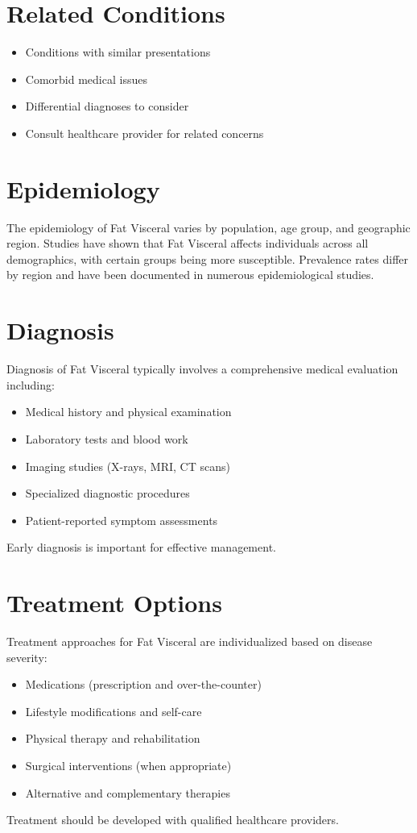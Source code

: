 \section*{Related Conditions}
\begin{itemize}
  \item Conditions with similar presentations
  \item Comorbid medical issues
  \item Differential diagnoses to consider
  \item Consult healthcare provider for related concerns
\end{itemize}

\section*{Epidemiology}
The epidemiology of Fat Visceral varies by population, age group, and geographic region. Studies have shown that Fat Visceral affects individuals across all demographics, with certain groups being more susceptible. Prevalence rates differ by region and have been documented in numerous epidemiological studies.

\section*{Diagnosis}
Diagnosis of Fat Visceral typically involves a comprehensive medical evaluation including:
\begin{itemize}
  \item Medical history and physical examination
  \item Laboratory tests and blood work
  \item Imaging studies (X-rays, MRI, CT scans)
  \item Specialized diagnostic procedures
  \item Patient-reported symptom assessments
\end{itemize}
Early diagnosis is important for effective management.

\section*{Treatment Options}
Treatment approaches for Fat Visceral are individualized based on disease severity:
\begin{itemize}
  \item Medications (prescription and over-the-counter)
  \item Lifestyle modifications and self-care
  \item Physical therapy and rehabilitation
  \item Surgical interventions (when appropriate)
  \item Alternative and complementary therapies
\end{itemize}
Treatment should be developed with qualified healthcare providers.

